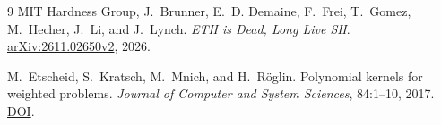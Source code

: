 \documentclass[11pt]{article}
\begin{document}
\begin{thebibliography}{9}
MIT Hardness Group, J.~Brunner, E.~D. Demaine, F.~Frei, T.~Gomez,
M.~Hecher, J.~Li, and J.~Lynch.
\emph{ETH is Dead, Long Live SH}.
\href{https://arxiv.org/abs/2611.02650v2}{arXiv:2611.02650v2}, 2026.

M.~Etscheid, S.~Kratsch, M.~Mnich, and H.~Röglin.
Polynomial kernels for weighted problems.
\emph{Journal of Computer and System Sciences}, 84:1--10, 2017.
\href{https://doi.org/10.1016/j.jcss.2016.06.004}{DOI}.
\end{thebibliography}
\end{document}
